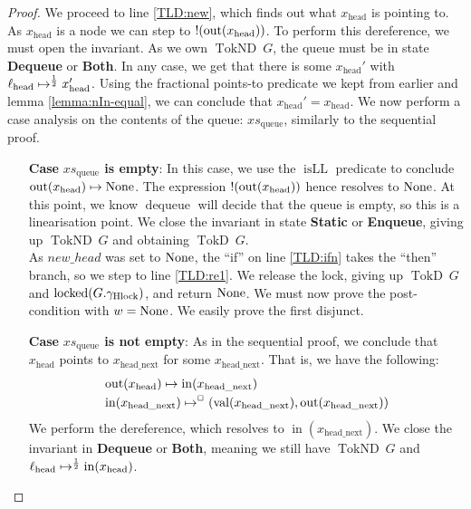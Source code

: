 \documentclass[a4paper, 10pt]{report}
\theoremstyle{definition}
\newcommand{\locked}{\operatorname{locked}}
\newcommand{\dequeue}{\operatorname{dequeue}}
\newcommand{\xsqueue}{xs_{\mathrm{queue}}}
\newcommand{\isLL}{\operatorname{isLL}}
\newcommand{\locN}[1]{\loc_{\mathrm{#1}}}
\newcommand{\lochead}{\locN{head}}
\newcommand{\nodeval}{\valB}
\newcommand{\nIn}[1]{\operatorname{in}(#1)}
\newcommand{\nVal}[1]{\operatorname{val}(#1)}
\newcommand{\nOut}[1]{\operatorname{out}(#1)}
\newcommand{\node}{x}
\newcommand{\nodeN}[1]{\node_{\mathrm{#1}}}
\newcommand{\nodehead}{\nodeN{head}}
\newcommand{\nodeheadnext}{\nodeN{head\_next}}
\newcommand{\StaticState}{\textbf{Static}\xspace}
\newcommand{\EnqueueState}{\textbf{Enqueue}\xspace}
\newcommand{\DequeueState}{\textbf{Dequeue}\xspace}
\newcommand{\BothState}{\textbf{Both}\xspace}
\newcommand{\Qg}{G}
\newcommand{\ghlock}{\gname_{\mathrm{Hlock}}}
\newcommand{\TokD}[1]{\operatorname{TokD} ~ #1}
\newcommand{\TokDQg}{\TokD{\Qg}}
\newcommand{\TokND}[1]{\operatorname{TokND} ~ #1}
\newcommand{\TokNDQg}{\TokND{\Qg}}
\newcommand{\isNode}[1]{\nIn{#1} \mapsto^{\persistently} (\nVal{#1}, \nOut{#1})}
\begin{document}
\begin{proof}
We proceed to line \ref{TLD:new}, which finds out what $\nodehead$ is pointing to. As $\nodehead$ is a node we can step to $\deref (\nOut{\nodehead})$. To perform this dereference, we must open the invariant. As we own $\TokNDQg$, the queue must be in state \DequeueState or \BothState. In any case, we get that there is some $\nodehead'$ with $\lochead \mapsto^{\frac{1}{2}} \nodehead'$. Using the fractional points-to predicate we kept from earlier and lemma \ref{lemma:nIn-equal}, we can conclude that $\nodehead' = \nodehead$. We now perform a case analysis on the contents of the queue: $\xsqueue$, similarly to the sequential proof.
\begin{itemize}
  \item[\textbf{Case}] \textbf{$\xsqueue$ is empty}:
  In this case, we use the $\isLL$ predicate to conclude $\nOut{\nodehead} \mapsto \None$. The expression $\deref (\nOut{\nodehead})$ hence resolves to $\operatorname{None}$. At this point, we know $\dequeue$ will decide that the queue is empty, so this is a linearisation point. We close the invariant in state \StaticState or \EnqueueState, giving up $\TokNDQg$ and obtaining $\TokDQg$.\\
  As $new\_head$ was set to $\operatorname{None}$, the ``if'' on line \ref{TLD:ifn} takes the ``then'' branch, so we step to line \ref{TLD:re1}. We release the lock, giving up $\TokDQg$ and $\locked(\Qg.\ghlock)$, and return $\operatorname{None}$. We must now prove the post-condition with $\nodeval = \None$. We easily prove the first disjunct.

  \item[\textbf{Case}] \textbf{$\xsqueue$ is not empty}:
  As in the sequential proof, we conclude that $\nodehead$ points to $\nodeheadnext$ for some $\nodeheadnext$. That is, we have the following:
  \begin{align}
    &\nOut{\nodehead} \mapsto \nIn{\nodeheadnext}\label{TLMSQ:spec:conc:proof:deq:headtonext}\\
    &\isNode{\nodeheadnext}\label{TLMSQ:spec:conc:proof:deq:headnextnode}
  \end{align}
  We perform the dereference, which resolves to $\nIn{\nodeheadnext}$. We close the invariant in \DequeueState or \BothState, meaning we still have $\TokNDQg$ and $\lochead \mapsto^{\frac{1}{2}} \nIn{\nodehead}$.


\end{itemize}
\end{proof}
\end{document}
